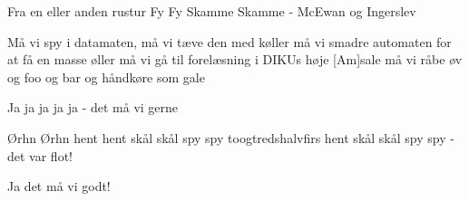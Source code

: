 {Fra en eller anden rustur}
{Fy Fy Skamme Skamme - McEwan og Ingerslev}
{
Må vi spy i datamaten,
må vi tæve den med køller
må vi smadre automaten 
for at få en masse øller
må vi gå til forelæsning 
i DIKUs høje [Am]sale
må vi råbe øv og foo og bar
og håndkøre som gale

Ja ja ja ja ja - det må vi gerne

Ørhn Ørhn hent hent skål skål spy spy
toogtredshalvfirs hent skål skål spy spy 
- det var flot!

Ja det må vi godt!

}

%
%

%

%

% 

%
